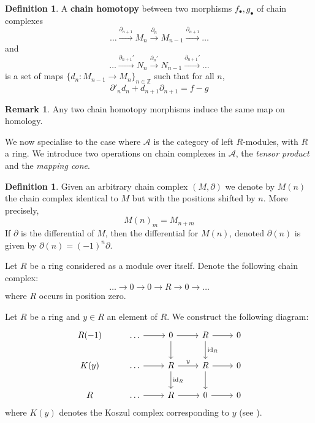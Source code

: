 \documentclass[12pt]{article}
\theoremstyle{plain}
\theoremstyle{definition}
\newtheorem{defn}[thm]{Definition} %
\newtheorem{remark}[thm]{Remark}
\newcommand{\bb}[1]{\mathbb{#1}}
\newcommand{\scr}[1]{\mathscr{#1}}
\newcommand{\lto}{\longrightarrow}
\begin{document}
\begin{defn}
A \textbf{chain homotopy} between two morphisms $f_\bullet, g_\bullet$ of chain complexes
\begin{equation}
\hdots \stackrel{\partial_{n+1}}{\lto} M_n \stackrel{\partial_{n}}{\lto} M_{n-1} \stackrel{\partial_{n+1}}{\lto} \hdots
\end{equation}
and
\begin{equation}
\hdots \stackrel{\partial_{n+1}'}{\lto} N_n \stackrel{\partial_{n}'}{\lto} N_{n-1} \stackrel{\partial_{n+1}'}{\lto} \hdots
\end{equation}
is a set of maps $\lbrace d_n: M_{n-1} \lto M_n\rbrace_{n \in \bb{Z}}$ such that for all $n$,
\begin{equation}
\partial'_nd_n + d_{n+1}\partial_{n+1} = f - g
\end{equation}
\end{defn}




\begin{remark}
Any two chain homotopy morphisms induce the same map on homology.
\end{remark}
We now specialise to the case where $\scr{A}$ is the category of left $R$-modules, with $R$ a ring. We introduce two operations on chain complexes in $\scr{A}$, the \emph{tensor product} and the \emph{mapping cone}.

\begin{defn}
Given an arbitrary chain complex $(M, \partial)$ we denote by $M(n)$ the chain complex identical to $M$ but with the positions shifted by $n$. More precisely,
\begin{equation}
M(n)_m = M_{n+m}
\end{equation}
If $\partial$ is the differential of $M$, then the differential for $M(n)$, denoted $\partial(n)$ is given by $\partial(n) = (-1)^n\partial$.

Let $R$ be a ring considered as a module over itself. Denote the following chain complex:
\begin{equation}
\hdots \lto 0 \lto 0 \lto R \lto 0 \lto \hdots
\end{equation}
where $R$ occurs in position zero.
\end{defn}
Let $R$ be a ring and $y \in R$ an element of $R$. We construct the following diagram:
\begin{equation}\label{eq:trivial}
\begin{tikzcd}
R(-1) & \hdots\arrow[r] & 0\arrow[r]\arrow[d] & R\arrow[r]\arrow[d,"{\operatorname{id}_R}"] & 0\\
K(y) & \hdots\arrow[r] & R\arrow[r,"y"]\arrow[d,"{\operatorname{id}_R}"] & R\arrow[r]\arrow[d] & 0\\
R & \hdots\arrow[r] & R\arrow[r] & 0\arrow[r] & 0
\end{tikzcd}
\end{equation}
where $K(y)$ denotes the Koszul complex corresponding to $y$ (see \cite{ComAlg}).
\end{document}
